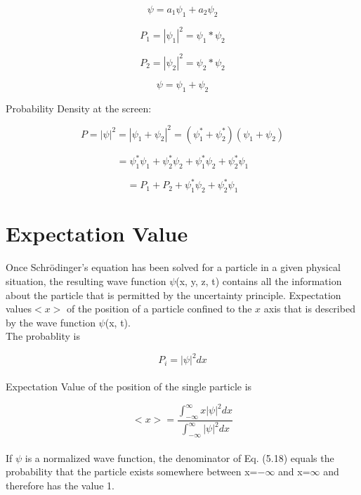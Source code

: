\documentclass{article}
\begin{document}
\begin{equation}
    \psi=a_1\psi_1+a_2\psi_2
\end{equation}

\begin{equation}
    P_1=|\psi_1|^2=\psi_1*\psi_2
\end{equation}

\begin{equation}
    P_2=|\psi_2|^2=\psi_2*\psi_2
\end{equation}

\begin{equation}
    \psi=\psi_1+\psi_2
\end{equation}

Probability Density at the screen:

\begin{equation}
    P=|\psi|^2=|\psi_1+\psi_2|^2=(\psi_1^*+\psi_2^*)(\psi_1+\psi_2)
\end{equation}

\begin{equation}
    =\psi_1^*\psi_1+\psi_2^*\psi_2+\psi_1^*\psi_2+\psi_2^*\psi_1
\end{equation}

\begin{equation}
    =P_1+P_2+\psi_1^*\psi_2+\psi_2^*\psi_1
\end{equation}

\section{Expectation Value}

Once Schrödinger’s equation has been solved for a particle in a given physical situation, the resulting wave function $\psi$(x, y, z, t) contains all the information about the
particle that is permitted by the uncertainty principle. Expectation values$<x>$ of the position of a
particle confined to the $x$ axis that is described by the wave function $\psi$(x, t).\vspace{6pt}
\\
The probablity is

\begin{equation}
    P_i=|\psi|^2dx
\end{equation}
\\
Expectation Value of the position of the single particle is

\begin{equation}
    <x>=\frac{\int_{-\infty}^{\infty} x|\psi|^2dx }{\int_{-\infty}^{\infty} |\psi|^2dx }
\end{equation}
\\
If $\psi$ is a normalized wave function, the denominator of Eq. (5.18) equals the probability that the particle exists somewhere between x=$-\infty$ and x=$\infty$ and therefore
has the value 1.
\end{document}
